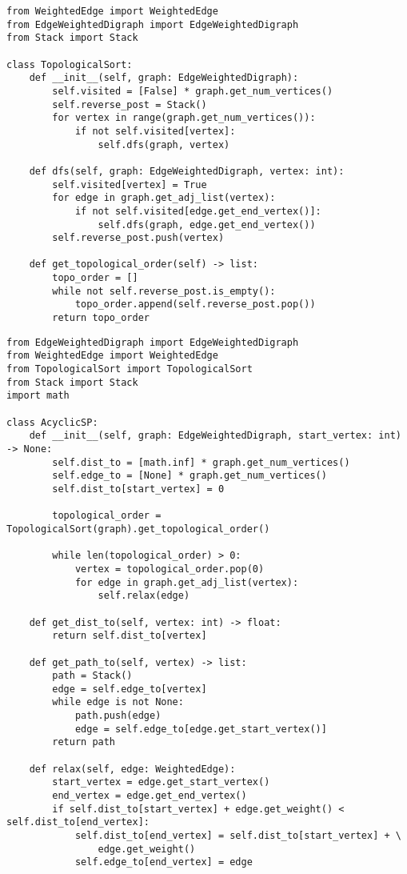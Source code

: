 \documentclass[a4paper]{article}
\begin{document}
\begin{lstlisting}
from WeightedEdge import WeightedEdge
from EdgeWeightedDigraph import EdgeWeightedDigraph
from Stack import Stack

class TopologicalSort:
    def __init__(self, graph: EdgeWeightedDigraph):
        self.visited = [False] * graph.get_num_vertices()
        self.reverse_post = Stack()
        for vertex in range(graph.get_num_vertices()):
            if not self.visited[vertex]:
                self.dfs(graph, vertex)

    def dfs(self, graph: EdgeWeightedDigraph, vertex: int):
        self.visited[vertex] = True
        for edge in graph.get_adj_list(vertex):
            if not self.visited[edge.get_end_vertex()]:
                self.dfs(graph, edge.get_end_vertex())
        self.reverse_post.push(vertex)

    def get_topological_order(self) -> list:
        topo_order = []
        while not self.reverse_post.is_empty():
            topo_order.append(self.reverse_post.pop())
        return topo_order
\end{lstlisting}

\begin{lstlisting}
from EdgeWeightedDigraph import EdgeWeightedDigraph
from WeightedEdge import WeightedEdge
from TopologicalSort import TopologicalSort
from Stack import Stack
import math

class AcyclicSP:
    def __init__(self, graph: EdgeWeightedDigraph, start_vertex: int) -> None:
        self.dist_to = [math.inf] * graph.get_num_vertices()
        self.edge_to = [None] * graph.get_num_vertices()
        self.dist_to[start_vertex] = 0

        topological_order = TopologicalSort(graph).get_topological_order()

        while len(topological_order) > 0:
            vertex = topological_order.pop(0)
            for edge in graph.get_adj_list(vertex):
                self.relax(edge)

    def get_dist_to(self, vertex: int) -> float:
        return self.dist_to[vertex]

    def get_path_to(self, vertex) -> list:
        path = Stack()
        edge = self.edge_to[vertex]
        while edge is not None:
            path.push(edge)
            edge = self.edge_to[edge.get_start_vertex()]
        return path

    def relax(self, edge: WeightedEdge):
        start_vertex = edge.get_start_vertex()
        end_vertex = edge.get_end_vertex()
        if self.dist_to[start_vertex] + edge.get_weight() < self.dist_to[end_vertex]:
            self.dist_to[end_vertex] = self.dist_to[start_vertex] + \
                edge.get_weight()
            self.edge_to[end_vertex] = edge
\end{lstlisting}
\end{document}
